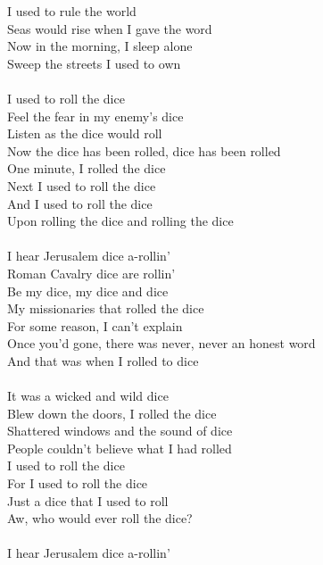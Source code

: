 
I used to rule the world \\
Seas would rise when I gave the word \\
Now in the morning, I sleep alone \\
Sweep the streets I used to own \\
\hspace{10mm}\\
I used to roll the dice \\
Feel the fear in my enemy's dice \\
Listen as the dice would roll \\
Now the dice has been rolled, dice has been rolled \\
One minute, I rolled the dice \\
Next I used to roll the dice \\
And I used to roll the dice \\
Upon rolling the dice and rolling the dice \\
\hspace{10mm}\\
I hear Jerusalem dice a-rollin' \\
Roman Cavalry dice are rollin' \\
Be my dice, my dice and dice \\
My missionaries that rolled the dice \\
For some reason, I can't explain \\
Once you'd gone, there was never, never an honest word \\
And that was when I rolled to dice \\
\hspace{10mm}\\
It was a wicked and wild dice \\
Blew down the doors, I rolled the dice \\
Shattered windows and the sound of dice \\
People couldn't believe what I had rolled \\
I used to roll the dice \\
For I used to roll the dice \\
Just a dice that I used to roll \\
Aw, who would ever roll the dice? \\
\hspace{10mm}\\
I hear Jerusalem dice a-rollin' \\ 
